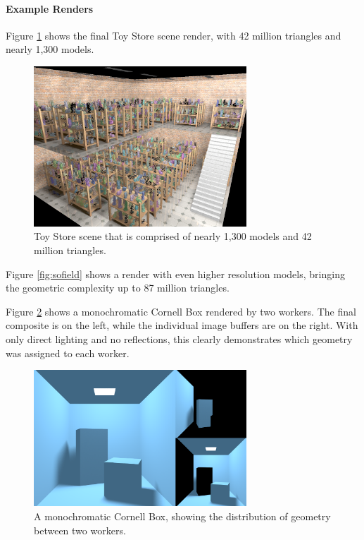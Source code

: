 \documentclass[a4paper,twoside]{article}
\begin{document}
\paragraph{Example Renders}
Figure \ref{fig:sotoystore} shows the final Toy Store scene render, with 42 million
triangles and nearly 1,300 models.

\begin{figure}[h!]
    \centering
    \includegraphics[width=80mm]{showoff/toystore.png}
    \caption{Toy Store scene that is comprised of nearly 1,300 models and 42 million triangles.}
    \label{fig:sotoystore}
\end{figure}

Figure \ref{fig:sofield} shows a render with even higher resolution models,
bringing the geometric complexity up to 87 million triangles.



Figure \ref{fig:sodist} shows a monochromatic Cornell Box rendered by two workers.
The final composite is on the left, while the individual image buffers are on the right.
With only direct lighting and no reflections, this clearly demonstrates which
geometry was assigned to each worker.

\begin{figure}[h!]
    \centering
    \includegraphics[width=80mm]{showoff/distribution.png}

    \caption{A monochromatic Cornell Box, showing the distribution of geometry between two workers.}
    \label{fig:sodist}
\end{figure}
\end{document}

